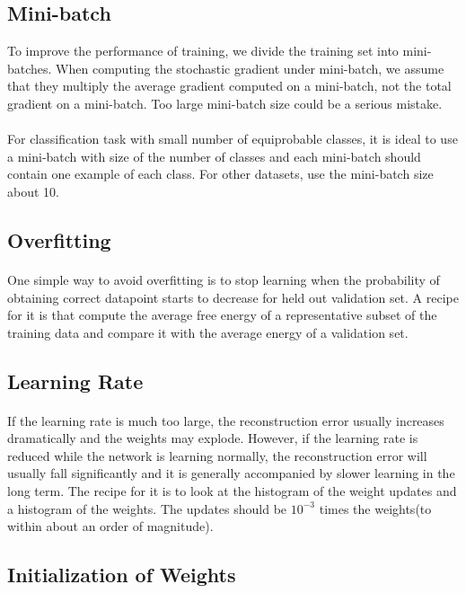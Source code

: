 \documentclass{article}
\begin{document}
\subsection{Mini-batch}
To improve the performance of training, we divide the training set into mini-batches. When computing the stochastic gradient under mini-batch, we assume that they multiply the average gradient computed on a mini-batch, not the total gradient on a mini-batch. Too large mini-batch size could be a serious mistake.
\paragraph{}For classification task with small number of equiprobable classes, it is ideal to use a mini-batch with size of the number of classes and each mini-batch should contain one example of each class. For other datasets, use the mini-batch size about 10.
\subsection{Overfitting}
\paragraph{}One simple way to avoid overfitting is to stop learning when the probability of obtaining correct datapoint starts to decrease for held out validation set. A recipe for it is that compute the average free energy of a representative subset of the training data and compare it with the average energy of a validation set.
\subsection{Learning Rate}
\paragraph{}If the learning rate is much too large, the reconstruction error usually increases dramatically and the weights may explode. However, if the learning rate is reduced while the network is learning normally, the reconstruction error will usually fall significantly and it is generally accompanied by slower learning in the long term. The recipe for it is to look at the histogram of the weight updates and a histogram of the weights. The updates should be $10^{-3}$ times the weights(to within about an order of magnitude).
\subsection{Initialization of Weights}
\end{document}
